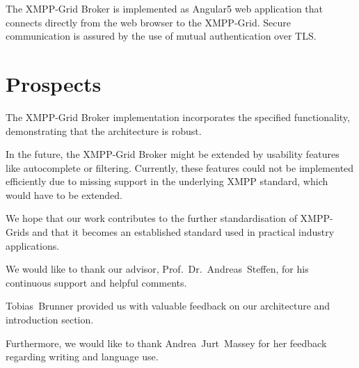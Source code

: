 The XMPP-Grid Broker is implemented as Angular5 web application that connects directly from the web browser to the XMPP-Grid. Secure communication is assured by the use of mutual authentication over TLS.

\section*{Prospects}

The XMPP-Grid Broker implementation incorporates the specified functionality, demonstrating that the architecture is robust.

In the future, the XMPP-Grid Broker might be extended by usability features like autocomplete or filtering. Currently, these features could not be implemented efficiently due to missing support in the underlying XMPP standard, which would have to be extended.

We hope that our work contributes to the further standardisation of XMPP-Grids and that it becomes an established standard used in practical industry applications.


\begin{acknowledgements}
\addchaptertocentry{\acknowledgementname} %
We would like to thank our advisor, Prof.~Dr.~Andreas~Steffen, for his continuous support and helpful comments.

Tobias~Brunner provided us with valuable feedback on our architecture and introduction section.

Furthermore, we would like to thank Andrea~Jurt~Massey for her feedback regarding writing and language use.
\end{acknowledgements}


\setcounter{tocdepth}{2}
\tableofcontents %


